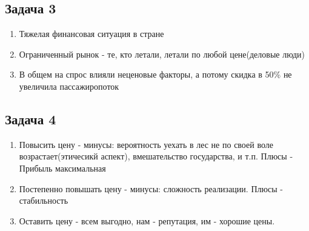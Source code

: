 \documentclass[a4paper,12pt]{article}
\begin{document}
\subsection{Задача 3}
\begin{enumerate}
    \item Тяжелая финансовая ситуация в стране
    \item Ограниченный рынок - те, кто летали, летали по любой цене(деловые люди)
    \item В общем на спрос влияли неценовые факторы, а потому скидка в 50\% не увеличила пассажиропоток
\end{enumerate}

\subsection{Задача 4}
\begin{enumerate}
    \item Повысить цену - минусы: вероятность уехать в лес не по своей воле возрастает(этичесикй аспект), вмешательство государства, и т.п. Плюсы - Прибыль максимальная
    \item Постепенно повышать цену - минусы: сложность реализации. Плюсы - стабильность
    \item Оставить цену - всем выгодно, нам - репутация, им - хорошие цены.
\end{enumerate}
\end{document}
